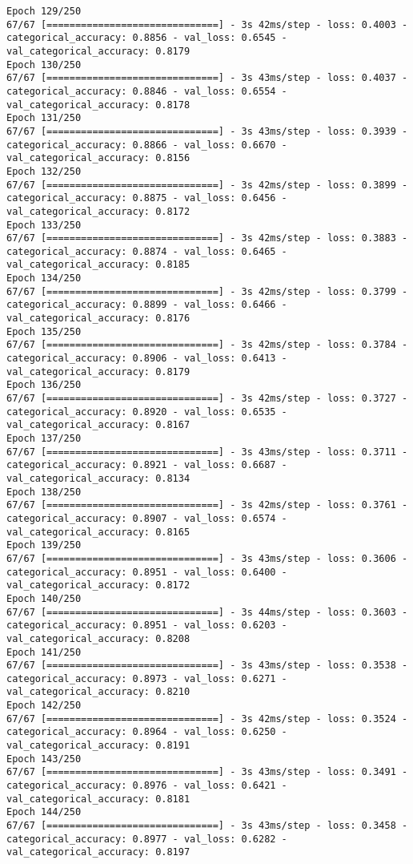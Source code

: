 \begin{lstlisting}
Epoch 129/250
67/67 [==============================] - 3s 42ms/step - loss: 0.4003 - categorical_accuracy: 0.8856 - val_loss: 0.6545 - val_categorical_accuracy: 0.8179
Epoch 130/250
67/67 [==============================] - 3s 43ms/step - loss: 0.4037 - categorical_accuracy: 0.8846 - val_loss: 0.6554 - val_categorical_accuracy: 0.8178
Epoch 131/250
67/67 [==============================] - 3s 43ms/step - loss: 0.3939 - categorical_accuracy: 0.8866 - val_loss: 0.6670 - val_categorical_accuracy: 0.8156
Epoch 132/250
67/67 [==============================] - 3s 42ms/step - loss: 0.3899 - categorical_accuracy: 0.8875 - val_loss: 0.6456 - val_categorical_accuracy: 0.8172
Epoch 133/250
67/67 [==============================] - 3s 42ms/step - loss: 0.3883 - categorical_accuracy: 0.8874 - val_loss: 0.6465 - val_categorical_accuracy: 0.8185
Epoch 134/250
67/67 [==============================] - 3s 42ms/step - loss: 0.3799 - categorical_accuracy: 0.8899 - val_loss: 0.6466 - val_categorical_accuracy: 0.8176
Epoch 135/250
67/67 [==============================] - 3s 42ms/step - loss: 0.3784 - categorical_accuracy: 0.8906 - val_loss: 0.6413 - val_categorical_accuracy: 0.8179
Epoch 136/250
67/67 [==============================] - 3s 42ms/step - loss: 0.3727 - categorical_accuracy: 0.8920 - val_loss: 0.6535 - val_categorical_accuracy: 0.8167
Epoch 137/250
67/67 [==============================] - 3s 43ms/step - loss: 0.3711 - categorical_accuracy: 0.8921 - val_loss: 0.6687 - val_categorical_accuracy: 0.8134
Epoch 138/250
67/67 [==============================] - 3s 42ms/step - loss: 0.3761 - categorical_accuracy: 0.8907 - val_loss: 0.6574 - val_categorical_accuracy: 0.8165
Epoch 139/250
67/67 [==============================] - 3s 43ms/step - loss: 0.3606 - categorical_accuracy: 0.8951 - val_loss: 0.6400 - val_categorical_accuracy: 0.8172
Epoch 140/250
67/67 [==============================] - 3s 44ms/step - loss: 0.3603 - categorical_accuracy: 0.8951 - val_loss: 0.6203 - val_categorical_accuracy: 0.8208
Epoch 141/250
67/67 [==============================] - 3s 43ms/step - loss: 0.3538 - categorical_accuracy: 0.8973 - val_loss: 0.6271 - val_categorical_accuracy: 0.8210
Epoch 142/250
67/67 [==============================] - 3s 42ms/step - loss: 0.3524 - categorical_accuracy: 0.8964 - val_loss: 0.6250 - val_categorical_accuracy: 0.8191
Epoch 143/250
67/67 [==============================] - 3s 43ms/step - loss: 0.3491 - categorical_accuracy: 0.8976 - val_loss: 0.6421 - val_categorical_accuracy: 0.8181
Epoch 144/250
67/67 [==============================] - 3s 43ms/step - loss: 0.3458 - categorical_accuracy: 0.8977 - val_loss: 0.6282 - val_categorical_accuracy: 0.8197

\end{lstlisting}
